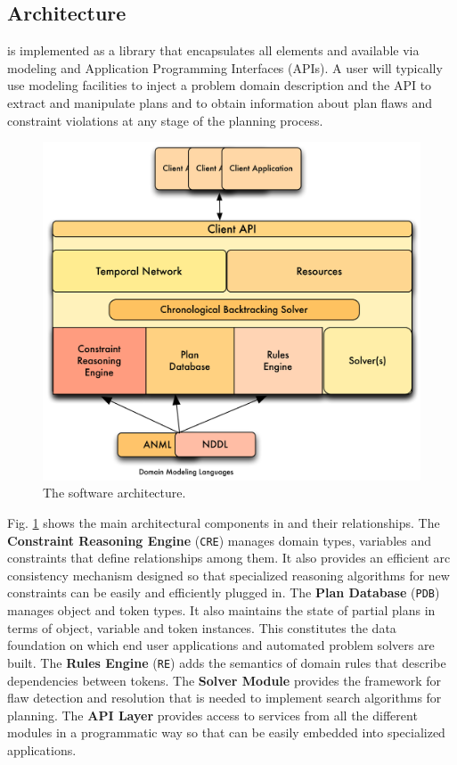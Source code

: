 \subsection{Architecture}
\label{sec:europa:arch}

\eu is implemented as a library that encapsulates all elements
 and available via modeling and
Application Programming Interfaces (APIs).  A user will typically use
modeling facilities to inject a problem domain description and the API
to extract and manipulate plans and to obtain information about plan
flaws and constraint violations at any stage of the planning process.

\begin{figure}[b]
\centering
\includegraphics[scale=0.5]{figs/EUROPA-Architecture.jpeg}
\caption{\small The \eu software architecture.}
\label{fig:europa-architecture}
\end{figure}

Fig. \ref{fig:europa-architecture} shows the main architectural
components in \eu and their relationships. The \textbf{Constraint
  Reasoning Engine} (\texttt{CRE}) manages domain types, variables and
constraints that define relationships among them. It also provides an
efficient arc consistency mechanism \cite{mackworth77} designed so
that specialized reasoning algorithms for new constraints can be
easily and efficiently plugged in. The \textbf{Plan Database}
(\texttt{PDB}) manages object and token types. It also maintains the
state of partial plans in terms of object, variable and token
instances. This constitutes the data foundation on which end user
applications and automated problem solvers are built. The
\textbf{Rules Engine} (\texttt{RE}) adds the semantics of domain rules
that describe dependencies between tokens. The \textbf{Solver Module}
provides the framework for flaw detection and resolution that is
needed to implement search algorithms for planning. The \textbf{API
  Layer} provides access to services from all the different modules in
a programmatic way so that \eu can be easily embedded into specialized
applications.

